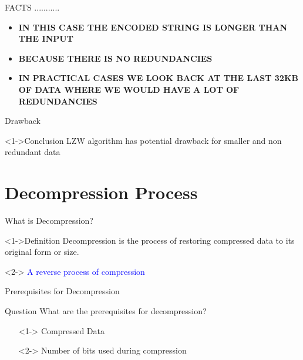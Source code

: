 \documentclass{beamer}
\begin{document}
\begin{frame}{FACTS ...........}
    \begin{itemize}
        \item<1-> \textcolor{TextRed}{\textbf{IN THIS CASE THE ENCODED STRING IS LONGER THAN THE INPUT}}
        \item<2-> \textcolor{TextRed}{\textbf{BECAUSE THERE IS NO REDUNDANCIES}}
        \item<3-> \textcolor{TextGreen}{\textbf{IN PRACTICAL CASES WE LOOK BACK AT THE LAST 32KB OF DATA WHERE WE WOULD HAVE A LOT OF REDUNDANCIES}}

    \end{itemize}
\end{frame}
\begin{frame}{Drawback}
  \begin{block}<1->{Conclusion}
    LZW algorithm has potential drawback for smaller and non redundant  data
  \end{block}
\end{frame}
\section{Decompression Process}

 \begin{frame}{What is Decompression?}
  \begin{block}<1->{Definition}
    Decompression is the process of restoring compressed data to its original form or size.
  \end{block}
  
  \begin{block}<2->{}
    \textcolor{blue}{A reverse process of compression}
  \end{block}
\end{frame}



\begin{frame}{Prerequisites for Decompression}
    \begin{block}{Question}
        What are the prerequisites for decompression?
    \end{block}
    
    \begin{itemize}
        \item[{\color{white}\textbullet}]<1-> Compressed Data
        \item[{\color{white}\textbullet}]<2-> Number of bits used during compression
    \end{itemize}
\end{frame}
\end{document}
